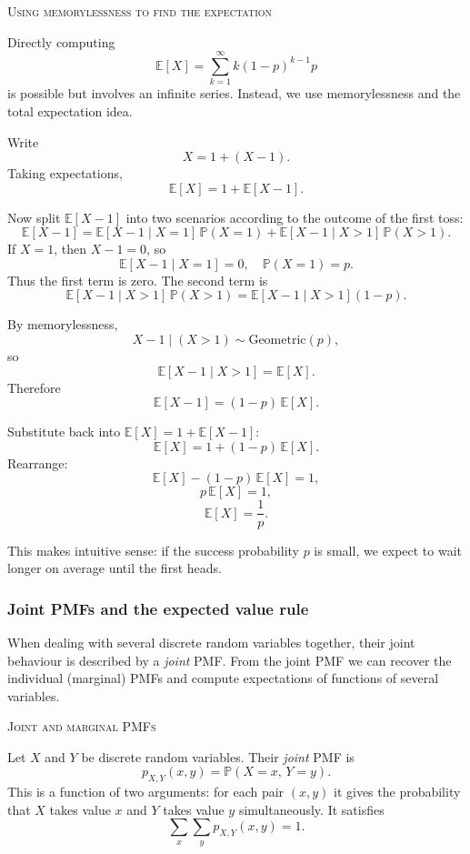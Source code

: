 \bigskip\textsc{Using memorylessness to find the expectation}

Directly computing
\[
\mathbb{E}[X] = \sum_{k=1}^{\infty} k (1-p)^{k-1} p
\]
is possible but involves an infinite series.  
Instead, we use memorylessness and the total expectation idea.

Write
\[
X = 1 + (X-1).
\]
Taking expectations,
\[
\mathbb{E}[X] = 1 + \mathbb{E}[X-1].
\]

Now split \(\mathbb{E}[X-1]\) into two scenarios according to the outcome of the first toss:
\[
\mathbb{E}[X-1]
= \mathbb{E}[X-1 \mid X=1]\,\mathbb{P}(X=1)
+ \mathbb{E}[X-1 \mid X>1]\,\mathbb{P}(X>1).
\]
If \(X=1\), then \(X-1=0\), so
\[
\mathbb{E}[X-1 \mid X=1] = 0, \quad \mathbb{P}(X=1) = p.
\]
Thus the first term is zero.  
The second term is
\[
\mathbb{E}[X-1 \mid X>1]\,\mathbb{P}(X>1)
= \mathbb{E}[X-1 \mid X>1] (1-p).
\]

By memorylessness,
\[
X-1 \mid (X>1) \sim \text{Geometric}(p),
\]
so
\[
\mathbb{E}[X-1 \mid X>1] = \mathbb{E}[X].
\]
Therefore
\[
\mathbb{E}[X-1] = (1-p)\,\mathbb{E}[X].
\]

Substitute back into \(\mathbb{E}[X] = 1 + \mathbb{E}[X-1]\):
\[
\mathbb{E}[X] = 1 + (1-p)\,\mathbb{E}[X].
\]
Rearrange:
\[
\mathbb{E}[X] - (1-p)\,\mathbb{E}[X] = 1,
\]
\[
p\,\mathbb{E}[X] = 1,
\]
\[
\mathbb{E}[X] = \frac{1}{p}.
\]

This makes intuitive sense: if the success probability \(p\) is small, we expect to wait longer on average until the first heads.



\subsubsection{Joint PMFs and the expected value rule}

When dealing with several discrete random variables together, their joint behaviour is described by a \textit{joint} PMF.  
From the joint PMF we can recover the individual (marginal) PMFs and compute expectations of functions of several variables.

\bigskip\textsc{Joint and marginal PMFs}

Let \(X\) and \(Y\) be discrete random variables.  
Their \textit{joint} PMF is
\[
p_{X,Y}(x,y) = \mathbb{P}(X = x,\, Y = y).
\]
This is a function of two arguments: for each pair \((x,y)\) it gives the probability that \(X\) takes value \(x\) and \(Y\) takes value \(y\) simultaneously.  
It satisfies
\[
\sum_{x}\sum_{y} p_{X,Y}(x,y) = 1.
\]

